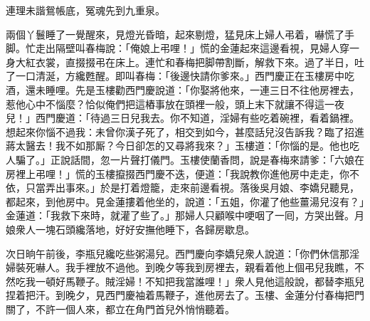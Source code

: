 \begin{myquote} 
連理未諧鴛帳底，冤魂先到九重泉。
\end{myquote} 

兩個丫鬟睡了一覺醒來，見燈光昏暗，起來剔燈，猛見床上婦人弔着，嚇慌了手脚。忙走出隔壁叫春梅說：「俺娘上弔哩！」慌的金蓮起來這邊看視，見婦人穿一身大紅衣裳，直掇掇弔在床上。連忙和春梅把脚帶割斷，解救下來。過了半日，吐了一口清涎，方纔甦醒。即叫春梅：「後邊快請你爹來。」西門慶正在玉樓房中吃酒，還未睡哩。先是玉樓勸西門慶說道：「你娶將他來，一連三日不往他房裡去，惹他心中不惱麼？恰似俺們把這樁事放在頭裡一般，頭上末下就讓不得這一夜兒！」西門慶道：「待過三日兒我去。你不知道，淫婦有些吃着碗裡，看着鍋裡。想起來你惱不過我：未曾你漢子死了，相交到如今，甚麼話兒沒告訴我？臨了招進蔣太醫去！我不如那厮？今日卻怎的又尋將我來？」玉樓道：「你惱的是。他也吃人騙了。」正說話間，忽一片聲打儀門。玉樓使蘭香問，說是春梅來請爹：「六娘在房裡上弔哩！」慌的玉樓攛掇西門慶不迭，便道：「我說教你進他房中走走，你不依，只當弄出事來。」於是打着燈籠，走來前邊看視。落後吳月娘、李嬌兒聽見，都起來，到他房中。見金蓮摟着他坐的，說道：「五姐，你灌了他些薑湯兒沒有？」金蓮道：「我救下來時，就灌了些了。」那婦人只顧喉中哽咽了一囘，方哭出聲。月娘衆人一塊石頭纔落地，好好安撫他睡下，各歸房歇息。

次日晌午前後，李瓶兒纔吃些粥湯兒。西門慶向李嬌兒衆人說道：「你們休信那淫婦裝死嚇人。我手裡放不過他。到晚夕等我到房裡去，親看着他上個弔兒我瞧，不然吃我一頓好馬鞭子。賊淫婦！不知把我當誰哩！」衆人見他這般說，都替李瓶兒捏着把汗。到晚夕，見西門慶袖着馬鞭子，進他房去了。玉樓、金蓮分付春梅把門關了，不許一個人來，都立在角門首兒外悄悄聽着。

